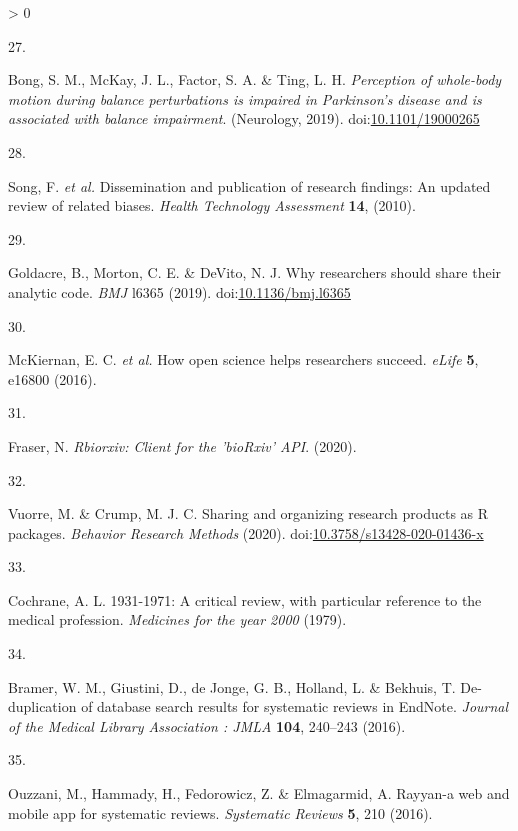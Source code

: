 \documentclass[a4paper, twoside]{templates/ociamthesis}
\newlength{\cslhangindent}
\newlength{\csllabelwidth}
\newenvironment{CSLReferences}[3] %
 {%
  \setlength{\parindent}{0pt}
  \ifodd #1 \everypar{\setlength{\hangindent}{\cslhangindent}}\ignorespaces\fi
  \ifnum #2 > 0
  \setlength{\parskip}{#2\baselineskip}
  \fi
 }%
 {}
\newcommand{\CSLLeftMargin}[1]{\parbox[t]{\maxof{\widthof{#1}}{\csllabelwidth}}{#1}}
\newcommand{\CSLRightInline}[1]{\parbox[t]{\linewidth - \csllabelwidth}{#1}}
\begin{document}
\begin{CSLReferences}{0}{0}
\leavevmode\hypertarget{ref-bong2019}{}%
\CSLLeftMargin{27. }
\CSLRightInline{Bong, S. M., McKay, J. L., Factor, S. A. \& Ting, L. H. \emph{Perception of whole-body motion during balance perturbations is impaired in {Parkinson}'s disease and is associated with balance impairment}. ({Neurology}, 2019). doi:\href{https://doi.org/10.1101/19000265}{10.1101/19000265}}

\leavevmode\hypertarget{ref-song2010}{}%
\CSLLeftMargin{28. }
\CSLRightInline{Song, F. \emph{et al.} Dissemination and publication of research findings: An updated review of related biases. \emph{Health Technology Assessment} \textbf{14}, (2010).}

\leavevmode\hypertarget{ref-goldacre2019b}{}%
\CSLLeftMargin{29. }
\CSLRightInline{Goldacre, B., Morton, C. E. \& DeVito, N. J. Why researchers should share their analytic code. \emph{BMJ} l6365 (2019). doi:\href{https://doi.org/10.1136/bmj.l6365}{10.1136/bmj.l6365}}

\leavevmode\hypertarget{ref-mckiernan2016c}{}%
\CSLLeftMargin{30. }
\CSLRightInline{McKiernan, E. C. \emph{et al.} How open science helps researchers succeed. \emph{eLife} \textbf{5}, e16800 (2016).}

\leavevmode\hypertarget{ref-rbiorxiv}{}%
\CSLLeftMargin{31. }
\CSLRightInline{Fraser, N. \emph{Rbiorxiv: {Client} for the '{bioRxiv}' {API}}. (2020).}

\leavevmode\hypertarget{ref-vuorre2020}{}%
\CSLLeftMargin{32. }
\CSLRightInline{Vuorre, M. \& Crump, M. J. C. Sharing and organizing research products as {R} packages. \emph{Behavior Research Methods} (2020). doi:\href{https://doi.org/10.3758/s13428-020-01436-x}{10.3758/s13428-020-01436-x}}

\leavevmode\hypertarget{ref-cochrane20001931}{}%
\CSLLeftMargin{33. }
\CSLRightInline{Cochrane, A. L. 1931-1971: A critical review, with particular reference to the medical profession. \emph{Medicines for the year 2000} (1979).}

\leavevmode\hypertarget{ref-bramer2016}{}%
\CSLLeftMargin{34. }
\CSLRightInline{Bramer, W. M., Giustini, D., de Jonge, G. B., Holland, L. \& Bekhuis, T. De-duplication of database search results for systematic reviews in {EndNote}. \emph{Journal of the Medical Library Association : JMLA} \textbf{104}, 240--243 (2016).}

\leavevmode\hypertarget{ref-ouzzani2016}{}%
\CSLLeftMargin{35. }
\CSLRightInline{Ouzzani, M., Hammady, H., Fedorowicz, Z. \& Elmagarmid, A. Rayyan-a web and mobile app for systematic reviews. \emph{Systematic Reviews} \textbf{5}, 210 (2016).}


\end{CSLReferences}
\end{document}
